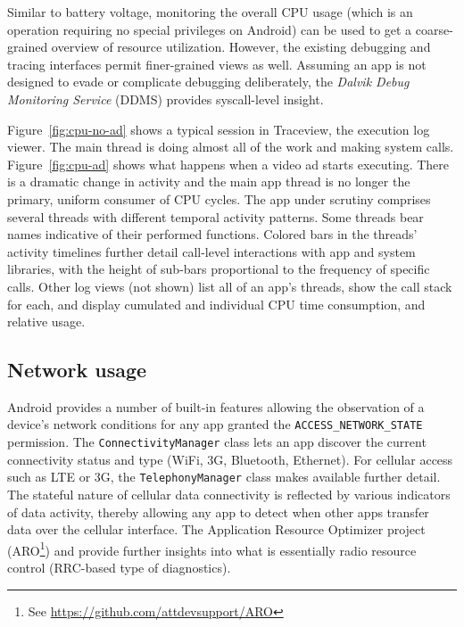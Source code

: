 Similar to battery voltage, monitoring the overall CPU usage 
(which is an operation requiring no special privileges on Android) 
can be used to get a coarse-grained overview of resource utilization. 
However, the existing debugging and tracing interfaces permit 
finer-grained views as well. Assuming an app is not designed to 
evade or complicate debugging deliberately, the 
\textit{Dalvik Debug Monitoring Service} (DDMS) 
provides syscall-level insight.  

Figure~\ref{fig:cpu-no-ad} shows a typical  
session in Traceview, the execution log viewer.  The main thread is doing almost all of the work
and making system calls.  Figure~\ref{fig:cpu-ad} shows what happens when a video ad starts 
executing.  There is a dramatic change in activity and the main app thread is no longer 
the primary, uniform consumer of CPU cycles.
The app under scrutiny comprises several threads with different 
temporal activity patterns. Some threads bear names indicative 
of their performed functions. Colored bars in the threads' activity 
timelines further detail call-level interactions with app and system 
libraries, with the height of sub-bars proportional to the frequency 
of specific calls.  
Other log views (not shown) list all of an app's threads, show the 
call stack for each, and display cumulated and individual CPU time 
consumption, and relative usage.



\subsection{Network usage}

Android provides a number of built-in features allowing the observation 
of a device's network conditions for any app granted the 
\texttt{ACCESS\_NETWORK\_STATE} permission. 
The \texttt{ConnectivityManager} class lets an app discover the 
current connectivity status and type (WiFi, 3G, Bluetooth, Ethernet). 
For cellular access such as LTE or 3G, the \texttt{TelephonyManager} 
class makes available further detail. The stateful nature of cellular 
data connectivity is reflected by various indicators of data activity, 
thereby allowing any app to detect when other apps transfer data over 
the cellular interface.  The Application Resource Optimizer project
(ARO\footnote{See \url{https://github.com/attdevsupport/ARO}}) and \cite{Ricciato2010551} 
provide further insights into what is 
essentially radio resource control (RRC-based type of diagnostics).

